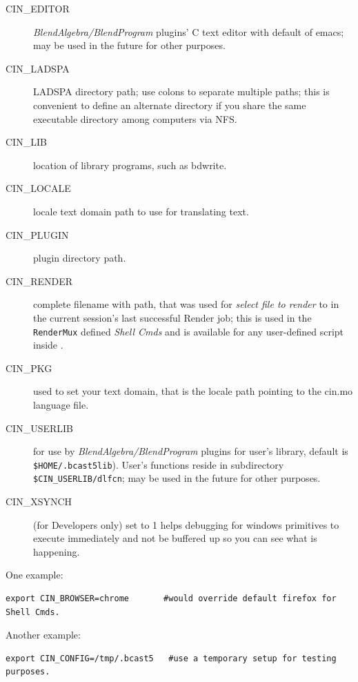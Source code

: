 \begin{description}
    \item[{\small CIN\_EDITOR}] \textit{BlendAlgebra/BlendProgram} plugins' C text editor with default of emacs; may be used in the future for other purposes.
    \item[{\small CIN\_LADSPA}] LADSPA directory path; use colons to separate multiple paths; this is convenient to define an alternate directory if you share the same executable directory among computers via NFS.
    \item[{\small CIN\_LIB}] location of library programs, such as bdwrite.
    \item[{\small CIN\_LOCALE}] locale text domain path to use for translating text.
    \item[{\small CIN\_PLUGIN}] plugin directory path.
    \item[{\small CIN\_RENDER}] complete filename with path, that was used for \textit{select file to render} to in the current session’s last successful Render job; this is used in the \texttt{RenderMux} defined \textit{Shell Cmds} and is available for any user-defined script inside \CGG{}.
    \item[{\small CIN\_PKG}] used to set your text domain, that is the locale path pointing to the cin.mo language file.
    \item[{\small CIN\_USERLIB}] for use by \textit{BlendAlgebra/BlendProgram} plugins for user's library,  default is \texttt{\$HOME/.bcast5lib}).  User's functions reside in subdirectory \texttt{\$CIN\_USERLIB/dlfcn}; may be used in the future for other purposes.
    \item[{\small CIN\_XSYNCH}] (for Developers only) set to 1 helps debugging for windows primitives to execute immediately and not be buffered up so you can see what is happening.
\end{description}

One example:

\begin{lstlisting}[numbers=none]
export CIN_BROWSER=chrome       #would override default firefox for Shell Cmds.
\end{lstlisting}

Another example:

\begin{lstlisting}[numbers=none]
export CIN_CONFIG=/tmp/.bcast5   #use a temporary setup for testing purposes.
\end{lstlisting}


